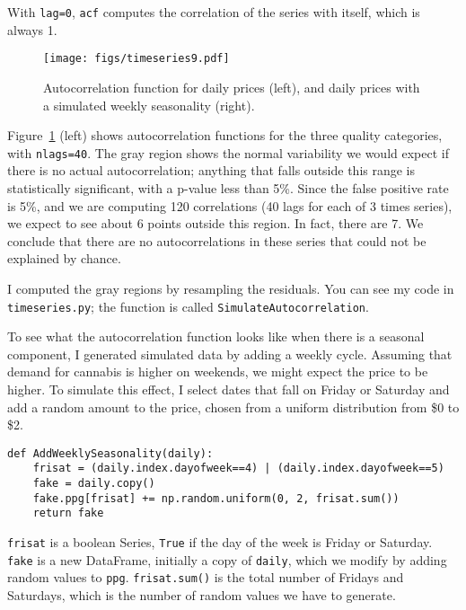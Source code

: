 \documentclass[12pt]{book}
\begin{document}
With {\tt lag=0}, {\tt acf} computes the correlation of the series
with itself, which is always 1.

\begin{figure}
\centerline{\texttt{[image: figs/timeseries9.pdf]}}
\caption{Autocorrelation function for daily prices (left), and
daily prices with a simulated weekly seasonality (right).}
\label{timeseries9}
\end{figure}

Figure~\ref{timeseries9} (left) shows autocorrelation functions for
the three quality categories, with {\tt nlags=40}.  The gray region
shows the normal variability we would expect if there is no actual
autocorrelation; anything that falls outside this range is
statistically significant, with a p-value less than 5\%.  Since
the false positive rate is 5\%, and
we are computing 120 correlations (40 lags for each of 3 times series),
we expect to see about 6 points outside this region.  In fact, there
are 7.  We conclude that there are no autocorrelations
in these series that could not be explained by chance.
   

I computed the gray regions by resampling the residuals.  You
can see my code in {\tt timeseries.py}; the function is called
{\tt SimulateAutocorrelation}.

To see what the autocorrelation function looks like when there is a
seasonal component, I generated simulated data by adding a weekly
cycle.  Assuming that demand for cannabis is higher on weekends, we
might expect the price to be higher.  To simulate this effect, I
select dates that fall on Friday or Saturday and add a random amount
to the price, chosen from a uniform distribution from \$0 to \$2.

\begin{verbatim}
def AddWeeklySeasonality(daily):
    frisat = (daily.index.dayofweek==4) | (daily.index.dayofweek==5)
    fake = daily.copy()
    fake.ppg[frisat] += np.random.uniform(0, 2, frisat.sum())
    return fake
\end{verbatim}

{\tt frisat} is a boolean Series, {\tt True} if the day of the
week is Friday or Saturday.  {\tt fake} is a new DataFrame, initially
a copy of {\tt daily}, which we modify by adding random values
to {\tt ppg}.  {\tt frisat.sum()} is the total number of Fridays
and Saturdays, which is the number of random values we have to
generate.
\end{document}
